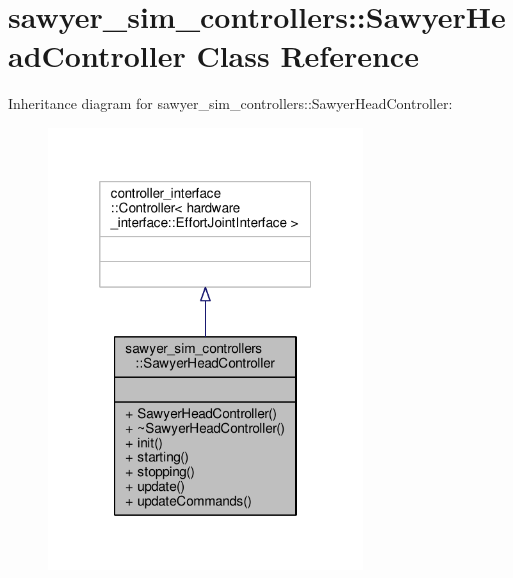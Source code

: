 \hypertarget{classsawyer__sim__controllers_1_1_sawyer_head_controller}{\section{sawyer\-\_\-sim\-\_\-controllers\-:\-:Sawyer\-Head\-Controller Class Reference}
\label{classsawyer__sim__controllers_1_1_sawyer_head_controller}
}


Inheritance diagram for sawyer\-\_\-sim\-\_\-controllers\-:\-:Sawyer\-Head\-Controller\-:
\nopagebreak
\begin{figure}[H]
\begin{center}
\leavevmode
\includegraphics[width=236pt]{classsawyer__sim__controllers_1_1_sawyer_head_controller__inherit__graph}
\end{center}
\end{figure}


